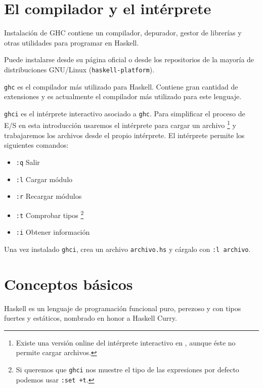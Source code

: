 \section {El compilador y el intérprete}

\begin{otro}{Instalación de GHC}
contiene un compilador, depurador, gestor de librerías y otras utilidades
para programar en Haskell.

Puede instalarse desde su página oficial o desde los
repositorios de la mayoría de distribuciones GNU/Linux
(\texttt{haskell-platform}).
\end{otro}

\texttt{ghc} es el compilador más utilizado para Haskell. Contiene gran cantidad
de extensiones y es actualmente el compilador más utilizado para este lenguaje.

\texttt{ghci} es el intérprete interactivo asociado a \texttt{ghc}.
Para simplificar el proceso de E/S en esta introducción usaremos el intérprete
para cargar un archivo \footnote{Existe una versión online del intérprete
interactivo en , aunque éste no permite cargar archivos.}
y trabajaremos los archivos desde el propio intérprete.
El intérprete permite los siguientes comandos:

\begin{itemize}
 \item \texttt{:q} \qquad  Salir
 \item \texttt{:l} \qquad  Cargar módulo
 \item \texttt{:r} \qquad  Recargar módulos
 \item \texttt{:t} \qquad  Comprobar tipos \footnote{
 Si queremos que \texttt{ghci} nos muestre el tipo de las expresiones por defecto
 podemos usar \texttt{:set +t}.}
 \item \texttt{:i} \qquad  Obtener información
\end{itemize}

Una vez instalado \texttt{ghci}, crea un archivo \texttt{archivo.hs} y
cárgalo con \texttt{:l archivo}.

\section{Conceptos básicos}

Haskell es un lenguaje de programación funcional puro, perezoso y con tipos fuertes
y estáticos, nombrado en honor a Haskell Curry.

